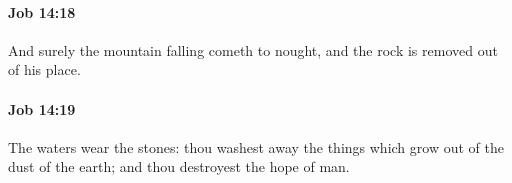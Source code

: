 		\paragraph{Job 14:18} %
			\label{JOB-14-18}

			And surely the mountain falling cometh to nought, and the rock is removed out of his place.


		\paragraph{Job 14:19} %
			\label{JOB-14-19}

			The waters wear the stones: thou washest away the things which grow out of the dust of the earth; and thou destroyest the hope of man.


